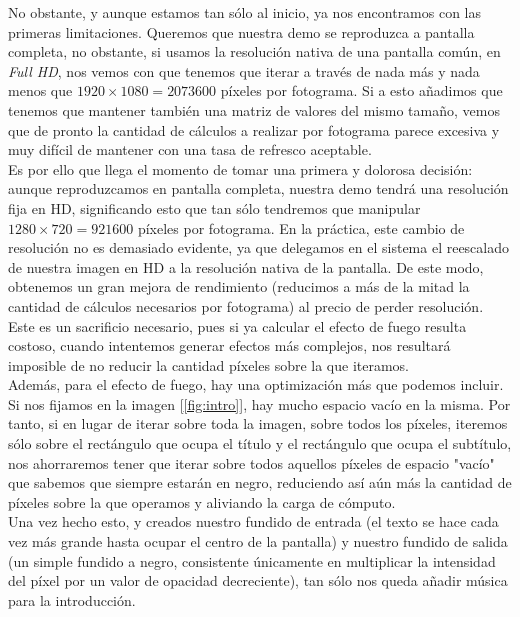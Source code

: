 No obstante, y aunque estamos tan sólo al inicio, ya nos encontramos con las primeras limitaciones. Queremos que nuestra demo se reproduzca a pantalla completa, no obstante, si usamos la resolución nativa de una pantalla común, en \emph{Full HD}, nos vemos con que tenemos que iterar a través de nada más y nada menos que \(1920 \times 1080 = 2073600\) píxeles por fotograma. Si a esto añadimos que tenemos que mantener también una matriz de valores del mismo tamaño, vemos que de pronto la cantidad de cálculos a realizar por fotograma parece excesiva y muy difícil de mantener con una tasa de refresco aceptable.\\

Es por ello que llega el momento de tomar una primera y dolorosa decisión: aunque reproduzcamos en pantalla completa, nuestra demo tendrá una resolución fija en HD, significando esto que tan sólo tendremos que manipular \(1280 \times 720 = 921600\) píxeles por fotograma. En la práctica, este cambio de resolución no es demasiado evidente, ya que delegamos en el sistema el reescalado de nuestra imagen en HD a la resolución nativa de la pantalla. De este modo, obtenemos un gran mejora de rendimiento (reducimos a más de la mitad la cantidad de cálculos necesarios por fotograma) al precio de perder resolución.\\

Este es un sacrificio necesario, pues si ya calcular el efecto de fuego resulta costoso, cuando intentemos generar efectos más complejos, nos resultará imposible de no reducir la cantidad píxeles sobre la que iteramos.\\

Además, para el efecto de fuego, hay una optimización más que podemos incluir. Si nos fijamos en la imagen [\ref{fig:intro}], hay mucho espacio vacío en la misma. Por tanto, si en lugar de iterar sobre toda la imagen, sobre todos los píxeles, iteremos sólo sobre el rectángulo que ocupa el título y el rectángulo que ocupa el subtítulo, nos ahorraremos tener que iterar sobre todos aquellos píxeles de espacio "vacío" que sabemos que siempre estarán en negro, reduciendo así aún más la cantidad de píxeles sobre la que operamos y aliviando la carga de cómputo.\\

Una vez hecho esto, y creados nuestro fundido de entrada (el texto se hace cada vez más grande hasta ocupar el centro de la pantalla) y nuestro fundido de salida (un simple fundido a negro, consistente únicamente en multiplicar la intensidad del píxel por un valor de opacidad decreciente), tan sólo nos queda añadir música para la introducción.\\

